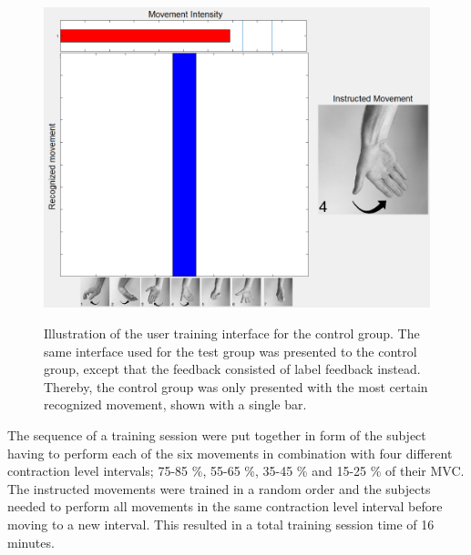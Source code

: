 \begin{figure}[H]
	\includegraphics[width=.47\textwidth]{figures/xBackground/usertraincontrolGUI} \\
	\caption{Illustration of the user training interface for the control group. The same interface used for the test group was presented to the control group, except that the feedback consisted of label feedback instead. Thereby, the control group was only presented with the most certain recognized movement, shown with a single bar.}
	\label{fig:control}
\end{figure}  
The sequence of a training session were put together in form of the subject having to perform each of the six movements in combination with four different contraction level intervals; 75-85 \%, 55-65 \%, 35-45 \% and 15-25 \% of their MVC. The instructed movements were trained in a random order and the subjects needed to perform all movements in the same contraction level interval before moving to a new interval. This resulted in a total training session time of 16 minutes.  

     


